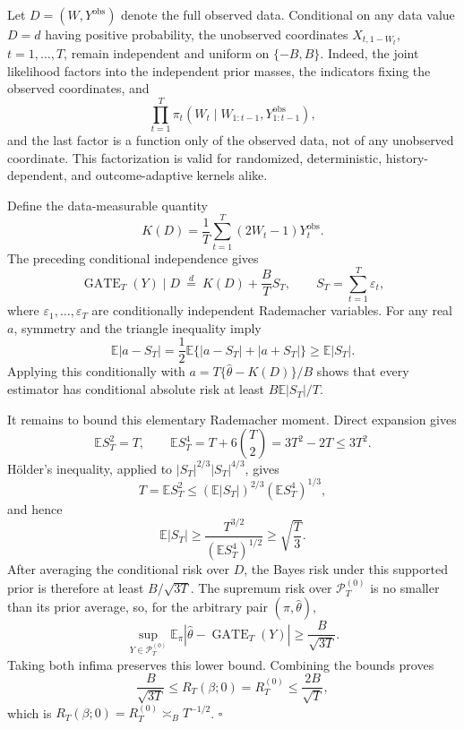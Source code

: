 Let \(D=(W,Y^{\mathrm{obs}})\) denote the full observed data.  Conditional on any data value \(D=d\) having positive probability, the unobserved coordinates \(X_{t,1-W_t}\), \(t=1,\ldots,T\), remain independent and uniform on \(\{-B,B\}\).  Indeed, the joint likelihood factors into the independent prior masses, the indicators fixing the observed coordinates, and
\[
\prod_{t=1}^T\pi_t(W_t\mid W_{1:t-1},Y_{1:t-1}^{\mathrm{obs}}),
\]
and the last factor is a function only of the observed data, not of any unobserved coordinate.  This factorization is valid for randomized, deterministic, history-dependent, and outcome-adaptive kernels alike.

Define the data-measurable quantity
\[
K(D)=\frac1T\sum_{t=1}^T(2W_t-1)Y_t^{\mathrm{obs}}.
\]
The preceding conditional independence gives
\[
\operatorname{GATE}_T(Y)\mid D
\ \overset{d}{=}\ K(D)+\frac BT S_T,
\qquad
S_T=\sum_{t=1}^T\varepsilon_t,
\]
where \(\varepsilon_1,\ldots,\varepsilon_T\) are conditionally independent Rademacher variables.  For any real \(a\), symmetry and the triangle inequality imply
\[
\mathbb E\lvert a-S_T\rvert
=\frac12\mathbb E\{\lvert a-S_T\rvert+\lvert a+S_T\rvert\}
\ge \mathbb E\lvert S_T\rvert.
\]
Applying this conditionally with \(a=T\{\widehat\theta-K(D)\}/B\) shows that every estimator has conditional absolute risk at least \(B\mathbb E\lvert S_T\rvert/T\).

It remains to bound this elementary Rademacher moment.  Direct expansion gives
\[
\mathbb E S_T^2=T,
\qquad
\mathbb E S_T^4=T+6\binom T2=3T^2-2T\le 3T^2.
\]
Hölder's inequality, applied to \(\lvert S_T\rvert^{2/3}\lvert S_T\rvert^{4/3}\), gives
\[
T=\mathbb E S_T^2
\le (\mathbb E\lvert S_T\rvert)^{2/3}(\mathbb E S_T^4)^{1/3},
\]
and hence
\[
\mathbb E\lvert S_T\rvert
\ge \frac{T^{3/2}}{(\mathbb E S_T^4)^{1/2}}
\ge \sqrt{\frac T3}.
\]
After averaging the conditional risk over \(D\), the Bayes risk under this supported prior is therefore at least \(B/\sqrt{3T}\).  The supremum risk over \(\mathcal P_T^{(0)}\) is no smaller than its prior average, so, for the arbitrary pair \((\pi,\widehat\theta)\),
\[
\sup_{Y\in\mathcal P_T^{(0)}}
\mathbb E_\pi\left\lvert\widehat\theta-\operatorname{GATE}_T(Y)\right\rvert
\ge \frac{B}{\sqrt{3T}}.
\]
Taking both infima preserves this lower bound.  Combining the bounds proves
\[
\frac{B}{\sqrt{3T}}
\le R_T(\beta;0)=R_T^{(0)}
\le \frac{2B}{\sqrt T},
\]
which is \(R_T(\beta;0)=R_T^{(0)}\asymp_B T^{-1/2}\). \(\square\)